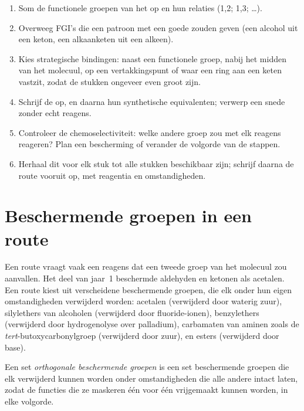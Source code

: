 \begin{method}\label{met:b2:retrosynthesis:retrosynthesis}
\begin{enumerate}
  \item Som de functionele groepen van het  op en hun relaties (1,2; 1,3; \dots).
  \item Overweeg FGI's die een patroon met een goede  zouden geven (een alcohol uit een keton, een
        alkaanketen uit een alkeen).
  \item Kies strategische bindingen: naast een functionele groep, nabij het midden van het molecuul, op een
        vertakkingspunt of waar een ring aan een keten vastzit, zodat de stukken ongeveer even groot zijn.
  \item Schrijf de  op, en daarna hun synthetische equivalenten; verwerp een snede zonder echt reagens.
  \item Controleer de chemoselectiviteit: welke andere groep zou met elk reagens reageren? Plan een bescherming
        of verander de volgorde van de stappen.
  \item Herhaal dit voor elk stuk tot alle stukken beschikbaar zijn; schrijf daarna de route vooruit op, met reagentia en
        omstandigheden.
\end{enumerate}
\end{method}

\section{Beschermende groepen in een route}

Een route vraagt vaak een reagens dat een tweede groep van het molecuul zou aanvallen. Het deel van jaar~1
beschermde aldehyden en ketonen als acetalen. Een route kiest uit verscheidene beschermende groepen, die elk
onder hun eigen omstandigheden verwijderd worden: acetalen (verwijderd door waterig zuur), silylethers van alcoholen (verwijderd door
fluoride-ionen), benzylethers (verwijderd door hydrogenolyse over palladium), carbamaten van aminen zoals
de \textit{tert}-butoxycarbonylgroep (verwijderd door zuur), en esters (verwijderd door base).

\begin{definition}\label{def:b2:retrosynthesis:orthogonal}
Een set \emph{orthogonale beschermende groepen} is een set beschermende
groepen die elk verwijderd kunnen worden onder omstandigheden die alle andere intact laten, zodat de functies die ze maskeren
één voor één vrijgemaakt kunnen worden, in elke volgorde.
\end{definition}

